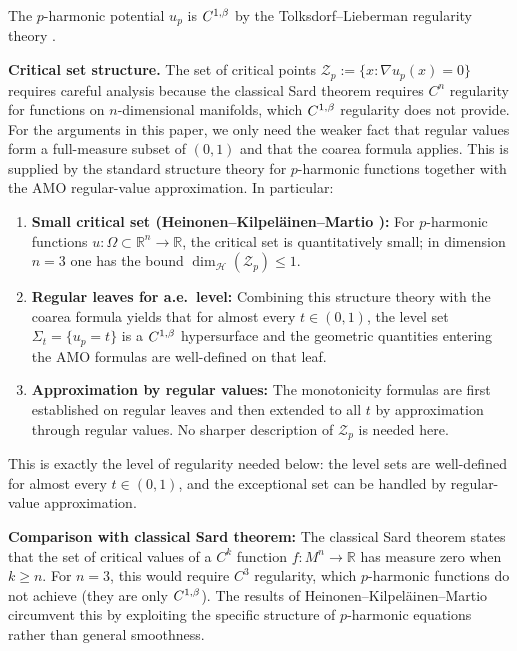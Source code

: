 \begin{remark}\label{rem:p-harmonic-regularity}
The $p$-harmonic potential $u_p$ is $C^{1,\beta}$ by the Tolksdorf--Lieberman regularity theory \cite{tolksdorf1984}. 

\textbf{Critical set structure.} The set of critical points $\mathcal{Z}_p := \{x : \nabla u_p(x) = 0\}$ requires careful analysis because the classical Sard theorem requires $C^n$ regularity for functions on $n$-dimensional manifolds, which $C^{1,\beta}$ regularity does not provide. For the arguments in this paper, we only need the weaker fact that regular values form a full-measure subset of $(0,1)$ and that the coarea formula applies. This is supplied by the standard structure theory for $p$-harmonic functions together with the AMO regular-value approximation. In particular:

\begin{enumerate}
    \item \textbf{Small critical set (Heinonen--Kilpel\"ainen--Martio \cite{heinonen1993}):} For $p$-harmonic functions $u: \Omega \subset \mathbb{R}^n \to \mathbb{R}$, the critical set is quantitatively small; in dimension $n = 3$ one has the bound $\dim_{\mathcal{H}}(\mathcal{Z}_p) \leq 1$.
    
    \item \textbf{Regular leaves for a.e.\ level:} Combining this structure theory with the coarea formula yields that for almost every $t \in (0,1)$, the level set $\Sigma_t = \{u_p=t\}$ is a $C^{1,\beta}$ hypersurface and the geometric quantities entering the AMO formulas are well-defined on that leaf.
    
    \item \textbf{Approximation by regular values:} The monotonicity formulas are first established on regular leaves and then extended to all $t$ by approximation through regular values. No sharper description of $\mathcal{Z}_p$ is needed here.
\end{enumerate}

This is exactly the level of regularity needed below: the level sets are well-defined for almost every $t \in (0,1)$, and the exceptional set can be handled by regular-value approximation.

\textbf{Comparison with classical Sard theorem:} The classical Sard theorem states that the set of critical values of a $C^k$ function $f: M^n \to \mathbb{R}$ has measure zero when $k \geq n$. For $n = 3$, this would require $C^3$ regularity, which $p$-harmonic functions do not achieve (they are only $C^{1,\beta}$). The results of Heinonen--Kilpel\"ainen--Martio circumvent this by exploiting the specific structure of $p$-harmonic equations rather than general smoothness.
\end{remark}

